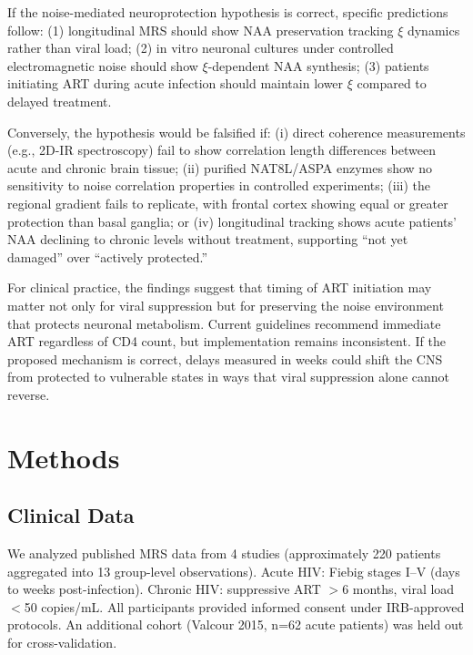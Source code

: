 \documentclass[10pt,a4paper]{article}
\begin{document}
If the noise-mediated neuroprotection hypothesis is correct, specific predictions follow: (1) longitudinal MRS should show NAA preservation tracking $\xi$ dynamics rather than viral load; (2) in vitro neuronal cultures under controlled electromagnetic noise should show $\xi$-dependent NAA synthesis; (3) patients initiating ART during acute infection should maintain lower $\xi$ compared to delayed treatment.

Conversely, the hypothesis would be falsified if: (i) direct coherence measurements (e.g., 2D-IR spectroscopy) fail to show correlation length differences between acute and chronic brain tissue; (ii) purified NAT8L/ASPA enzymes show no sensitivity to noise correlation properties in controlled experiments; (iii) the regional gradient fails to replicate, with frontal cortex showing equal or greater protection than basal ganglia; or (iv) longitudinal tracking shows acute patients' NAA declining to chronic levels without treatment, supporting ``not yet damaged'' over ``actively protected.''

For clinical practice, the findings suggest that timing of ART initiation may matter not only for viral suppression but for preserving the noise environment that protects neuronal metabolism. Current guidelines recommend immediate ART regardless of CD4 count\cite{palella1998}, but implementation remains inconsistent. If the proposed mechanism is correct, delays measured in weeks could shift the CNS from protected to vulnerable states in ways that viral suppression alone cannot reverse.

\section{Methods}

\subsection{Clinical Data}

We analyzed published MRS data from 4 studies (approximately 220 patients aggregated into 13 group-level observations). Acute HIV: Fiebig stages I--V (days to weeks post-infection). Chronic HIV: suppressive ART $>$6 months, viral load $<$50 copies/mL. All participants provided informed consent under IRB-approved protocols\cite{sailasuta2012,young2014,valcour2012}. An additional cohort (Valcour 2015, n=62 acute patients) was held out for cross-validation.
\end{document}
